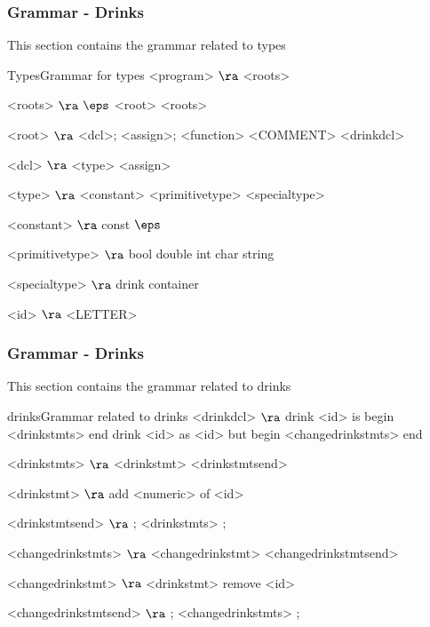 \subsubsection{Grammar - Drinks}
This section contains the grammar related to types
\begin{grammatik}{Types}{Grammar for types}
<program> $\ra$ <roots>

<roots> $\ra$ $\eps$
\alt <root> <roots>

<root> $\ra$ <dcl>;
\alt <assign>;
\alt <function>
\alt <COMMENT>
\alt <drinkdcl>

<dcl> $\ra$ <type> <assign>

<type> $\ra$ <constant> <primitivetype>
\alt <specialtype>

<constant> $\ra$ const
\alt $\eps$

<primitivetype> $\ra$ bool
\alt double
\alt int
\alt char
\alt string

<specialtype> $\ra$ drink 
\alt container 

<id> $\ra$ <LETTER>
\end{grammatik}

\subsubsection{Grammar - Drinks}
This section contains the grammar related to drinks
\begin{grammatik}{drinks}{Grammar related to drinks}
<drinkdcl> $\ra$ drink <id> is begin <drinkstmts> end
\alt drink <id> as <id> but begin <changedrinkstmts> end

<drinkstmts> $\ra$ <drinkstmt> <drinkstmtsend>

<drinkstmt> $\ra$ add <numeric> of <id>

<drinkstmtsend> $\ra$ ; <drinkstmts>
\alt ;

<changedrinkstmts> $\ra$ <changedrinkstmt> <changedrinkstmtsend>

<changedrinkstmt> $\ra$ <drinkstmt>
\alt remove <id>

<changedrinkstmtsend> $\ra$ ; <changedrinkstmts>
\alt ;
\end{grammatik}

